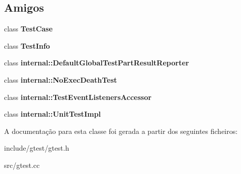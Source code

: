 \subsection*{Amigos}
\begin{DoxyCompactItemize}
\item 
\hypertarget{classtesting_1_1TestEventListeners_aff779e55b06adfa7c0088bd10253f0f0}{class {\bfseries Test\-Case}}\label{classtesting_1_1TestEventListeners_aff779e55b06adfa7c0088bd10253f0f0}

\item 
\hypertarget{classtesting_1_1TestEventListeners_a4c49c2cdb6c328e6b709b4542f23de3c}{class {\bfseries Test\-Info}}\label{classtesting_1_1TestEventListeners_a4c49c2cdb6c328e6b709b4542f23de3c}

\item 
\hypertarget{classtesting_1_1TestEventListeners_abae39633da9932847b41cb80efd62115}{class {\bfseries internal\-::\-Default\-Global\-Test\-Part\-Result\-Reporter}}\label{classtesting_1_1TestEventListeners_abae39633da9932847b41cb80efd62115}

\item 
\hypertarget{classtesting_1_1TestEventListeners_afddba49fdf3f493532b4d5efb9814f4e}{class {\bfseries internal\-::\-No\-Exec\-Death\-Test}}\label{classtesting_1_1TestEventListeners_afddba49fdf3f493532b4d5efb9814f4e}

\item 
\hypertarget{classtesting_1_1TestEventListeners_addbc107b6b445617c880182bd4f44cf9}{class {\bfseries internal\-::\-Test\-Event\-Listeners\-Accessor}}\label{classtesting_1_1TestEventListeners_addbc107b6b445617c880182bd4f44cf9}

\item 
\hypertarget{classtesting_1_1TestEventListeners_acc0a5e7573fd6ae7ad1878613bb86853}{class {\bfseries internal\-::\-Unit\-Test\-Impl}}\label{classtesting_1_1TestEventListeners_acc0a5e7573fd6ae7ad1878613bb86853}

\end{DoxyCompactItemize}


A documentação para esta classe foi gerada a partir dos seguintes ficheiros\-:\begin{DoxyCompactItemize}
\item 
include/gtest/gtest.\-h\item 
src/gtest.\-cc\end{DoxyCompactItemize}
